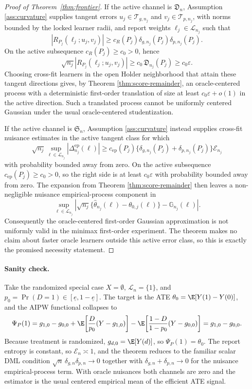 \begin{proof}[Proof of Theorem~\ref{thm:frontier}]
If the active channel is \(\mathfrak{D}_n\), Assumption
\ref{ass:curvature} supplies tangent errors \(u_j\in\mathcal{T}_{g,n_j}\) and
\(v_j\in\mathcal{T}_{p,n_j}\), with norms bounded by the locked learner radii,
and report weights \(\ell_j\in\mathcal{L}_{n_j}\) such that
\[
|R_{P_j}(\ell_j;u_j,v_j)|
\ge c_R(P_j)\delta_{g,n_j}(P_j)\delta_{p,n_j}(P_j).
\]
On the active subsequence \(c_R(P_j)\ge c_0>0\), hence
\[
\sqrt{n_j}|R_{P_j}(\ell_j;u_j,v_j)|
\ge c_0\,\mathfrak{D}_{n_j}(P_j)
\ge c_0\varepsilon .
\]
Choosing cross-fit learners in the open Holder neighborhood that attain these
tangent directions gives, by Theorem \ref{thm:score-remainder}, an
oracle-centered process with a deterministic first-order translation of size at
least \(c_0\varepsilon+o(1)\) in the active direction.  Such a translated
process cannot be uniformly centered Gaussian under the usual
oracle-centered studentization.

If the active channel is \(\mathfrak{S}_n\), Assumption
\ref{ass:curvature} instead supplies cross-fit nuisance estimates in the
active tangent class for which
\[
\sqrt{n_j}\sup_{\ell\in\mathcal{L}_{n_j}}
|\Delta^{\mathrm{ep}}_{n_j}(\ell)|
\ge c_{\mathrm{ep}}(P_j)
\{\delta_{g,n_j}(P_j)+\delta_{p,n_j}(P_j)\}\mathcal{E}_{n_j}
\]
with probability bounded away from zero.  On the active subsequence
\(c_{\mathrm{ep}}(P_j)\ge c_0>0\), so the right side is at least
\(c_0\varepsilon\) with probability bounded away from zero.  The expansion from
Theorem \ref{thm:score-remainder} then leaves a non-negligible nuisance
empirical-process component in
\[
\sup_{\ell\in\mathcal{L}_{n_j}}
\left|\sqrt{n_j}\{\hat\theta_{n_j}(\ell)-\theta_{0,j}(\ell)\}
-\mathbb{G}_{n_j}(\ell)\right|.
\]
Consequently the oracle-centered first-order Gaussian approximation is not
uniformly valid in the minimax first-order experiment.  The theorem makes no
claim about faster oracle learners outside this active error class, so this is
exactly the promised necessity statement.
\end{proof}

\paragraph{Sanity check.}
Take the randomized special case \(X=\emptyset\), \(\mathcal{L}_n=\{1\}\), and
\(p_0=\Pr(D=1)\in[\underline e,1-\underline e]\).  The target is the ATE
\(\theta_0= \E[Y(1)-Y(0)]\), and the AIPW functional collapses to
\[
\Psi_P(1)=g_{1,0}-g_{0,0}
+\E\!\left[\frac{D}{p_0}(Y-g_{1,0})\right]
-\E\!\left[\frac{1-D}{1-p_0}(Y-g_{0,0})\right]
=g_{1,0}-g_{0,0}.
\]
Because treatment is randomized, \(g_{d,0}=\E[Y(d)]\), so
\(\Psi_P(1)=\theta_0\).  The report entropy is constant, so
\(\mathcal{E}_n\asymp1\), and the theorem reduces to the familiar scalar DML
condition
\(\sqrt n\,\delta_{g,n}\delta_{p,n}\to0\) together with
\(\delta_{g,n}+\delta_{p,n}\to0\) for the nuisance empirical-process term.
With oracle nuisances both channels are zero and the estimator is the usual
centered empirical mean of the efficient ATE signal.

